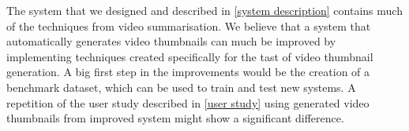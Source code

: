 \documentclass{../resources/sig-alternate-05-2015}
\begin{document}
The system that we designed and described in \ref{system description} contains much of the techniques from video summarisation. We believe that a system that automatically generates video thumbnails can much be improved by implementing techniques created specifically for the tast of video thumbnail generation. A big first step in the improvements would be the creation of a benchmark dataset, which can be used to train and test new systems. A repetition of the user study described in \ref{user study} using generated video thumbnails from improved system might show a significant difference.



\printbibliography
\end{document}
